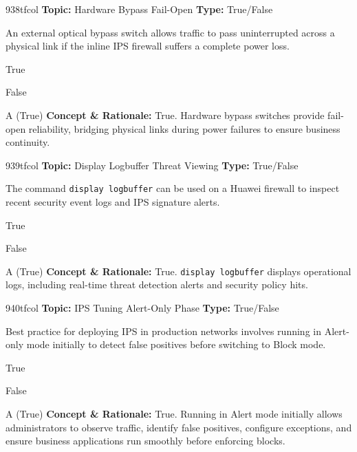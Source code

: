 \begin{qcard}{938}{tfcol}
\textcolor{darkslate!75}{\small\textbf{Topic:} Hardware Bypass Fail-Open \hfill \textbf{Type:} True/False}\vspace{0.4em}\par
An external optical bypass switch allows traffic to pass uninterrupted across a physical link if the inline IPS firewall suffers a complete power loss.
\begin{qoptions}
\item True
\item False
\end{qoptions}
\end{qcard}
\nopagebreak
\begin{explainbox}{A (True)}
\textbf{Concept \& Rationale:} True. Hardware bypass switches provide fail-open reliability, bridging physical links during power failures to ensure business continuity.
\end{explainbox}

\begin{qcard}{939}{tfcol}
\textcolor{darkslate!75}{\small\textbf{Topic:} Display Logbuffer Threat Viewing \hfill \textbf{Type:} True/False}\vspace{0.4em}\par
The command \texttt{display logbuffer} can be used on a Huawei firewall to inspect recent security event logs and IPS signature alerts.
\begin{qoptions}
\item True
\item False
\end{qoptions}
\end{qcard}
\nopagebreak
\begin{explainbox}{A (True)}
\textbf{Concept \& Rationale:} True. \texttt{display logbuffer} displays operational logs, including real-time threat detection alerts and security policy hits.
\end{explainbox}

\begin{qcard}{940}{tfcol}
\textcolor{darkslate!75}{\small\textbf{Topic:} IPS Tuning Alert-Only Phase \hfill \textbf{Type:} True/False}\vspace{0.4em}\par
Best practice for deploying IPS in production networks involves running in Alert-only mode initially to detect false positives before switching to Block mode.
\begin{qoptions}
\item True
\item False
\end{qoptions}
\end{qcard}
\nopagebreak
\begin{explainbox}{A (True)}
\textbf{Concept \& Rationale:} True. Running in Alert mode initially allows administrators to observe traffic, identify false positives, configure exceptions, and ensure business applications run smoothly before enforcing blocks.
\end{explainbox}

